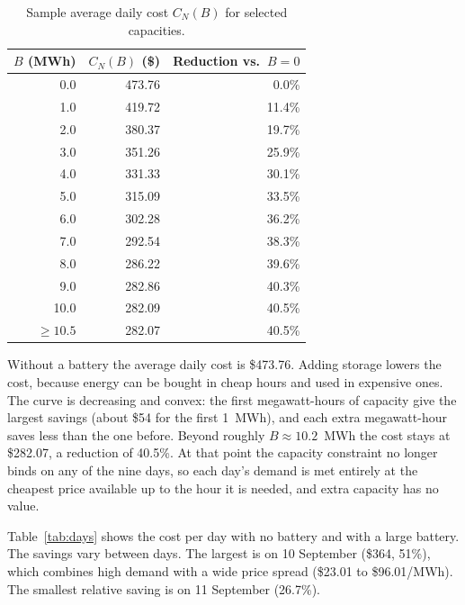\documentclass[11pt]{article}
\begin{document}
\begin{table}[h]
  \centering
  \caption{Sample average daily cost $C_N(B)$ for selected capacities.}
  \label{tab:results}
  \begin{tabular}{rrr}
    \toprule
    $B$ (MWh) & $C_N(B)$ (\$) & Reduction vs.\ $B = 0$ \\
    \midrule
     0.0 & 473.76 &  0.0\% \\
     1.0 & 419.72 & 11.4\% \\
     2.0 & 380.37 & 19.7\% \\
     3.0 & 351.26 & 25.9\% \\
     4.0 & 331.33 & 30.1\% \\
     5.0 & 315.09 & 33.5\% \\
     6.0 & 302.28 & 36.2\% \\
     7.0 & 292.54 & 38.3\% \\
     8.0 & 286.22 & 39.6\% \\
     9.0 & 282.86 & 40.3\% \\
    10.0 & 282.09 & 40.5\% \\
    $\ge 10.5$ & 282.07 & 40.5\% \\
    \bottomrule
  \end{tabular}
\end{table}

Without a battery the average daily cost is \$473.76. Adding storage lowers the
cost, because energy can be bought in cheap hours and used in expensive ones. The
curve is decreasing and convex: the first megawatt-hours of capacity give the
largest savings (about \$54 for the first 1~MWh), and each extra megawatt-hour
saves less than the one before. Beyond roughly $B \approx 10.2$~MWh the cost stays
at \$282.07, a reduction of 40.5\%. At that point the capacity constraint no
longer binds on any of the nine days, so each day's demand is met entirely at the
cheapest price available up to the hour it is needed, and extra capacity has no
value.

Table~\ref{tab:days} shows the cost per day with no battery and with a large
battery. The savings vary between days. The largest is on 10 September (\$364,
51\%), which combines high demand with a wide price spread (\$23.01 to
\$96.01/MWh). The smallest relative saving is on 11 September (26.7\%).
\end{document}
